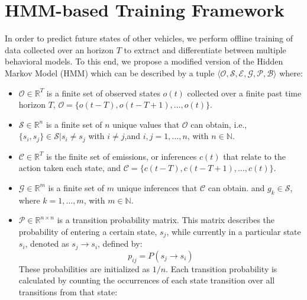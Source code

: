 \documentclass[letterpaper, 10 pt, conference]{ieeeconf}  %
\newcommand\NB[1]{$\spadesuit$\footnote{NB: #1}}
\begin{document}
\section{HMM-based Training Framework} \label{sec:fmwk}
 In order to predict future states of other vehicles, we perform offline training of data collected over an horizon $T$ to extract and differentiate between multiple behavioral models. To this end, we propose a modified version of the Hidden Markov Model (HMM) \cite{woohmm} which can be described by a tuple $\langle \mathcal{O},\mathcal{S},\mathcal{E},\mathcal{G},\mathcal{P},\mathcal{B} \rangle$  where:
\begin{itemize}
    \item $\mathcal{O}\in\mathbb{R}^T$ is a finite set of observed states $o(t)$ collected over a finite past time horizon $T$, $\mathcal{O} = \{ o(t-T), o(t-T+1), \ldots, o(t)\}$. 
    \item  $\mathcal{S}\in\mathbb{R}^n$ is a finite set of $n$ unique values that $\mathcal{O}$ can obtain, i.e., $\{s_i,s_j\} \in \mathcal{S} \vert s_i \neq s_j$ with $i\neq j$,and $i,j = 1,\ldots,n$, with $n \in \mathbb{N}$.
    \item $\mathcal{C}\in\mathbb{R}^T$ %
    is the finite set of emissions, or inferences $c(t)$ that relate to the action taken each state, and $\mathcal{C} = \{ c(t-T), c(t-T+1), \ldots, c(t)\}$. %
    \item $\mathcal{G}\in\mathbb{R}^m$ is a finite set of $m$ unique inferences that $\mathcal{C}$ can obtain. and $g_k \in \mathcal{S}$, where $k = 1,\ldots,m$, with $m \in \mathbb{N}$. 
    \item $\mathcal{P}\in\mathbb{R}^{n\times n}$ is a transition probability matrix. This matrix describes the probability of entering a certain state, $s_{j}$, while currently in a particular state $s_{i}$, denoted as $s_j \to s_i$, defined by:
        \begin{equation}
            p_{ij} = P(s_j\to s_i)
        \end{equation}
        These probabilities are initialized as $1/n$. Each transition probability is calculated by counting the occurrences of each state transition over all transitions from that state:

\end{itemize}
\end{document}

